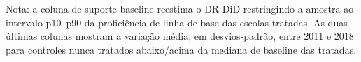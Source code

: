 \begin{table}[htbp]
\centering
\caption{Diagnóstico de regressão à média}
\label{tab:diagnostico_regressao_media}
\vspace{0.2cm}
\begin{flushleft}
\footnotesize Nota: a coluna de suporte baseline reestima o DR-DiD restringindo a amostra ao intervalo p10--p90 da proficiência de linha de base das escolas tratadas. As duas últimas colunas mostram a variação média, em desvios-padrão, entre 2011 e 2018 para controles nunca tratados abaixo/acima da mediana de baseline das tratadas.
\end{flushleft}
\end{table}
